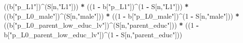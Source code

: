 \documentclass[
]{book}
\newenvironment{Shaded}{\begin{snugshade}}{\end{snugshade}}
\newcommand{\DecValTok}[1]{\textcolor[rgb]{0.00,0.00,0.81}{#1}}
\newcommand{\NormalTok}[1]{#1}
\newcommand{\SpecialCharTok}[1]{\textcolor[rgb]{0.81,0.36,0.00}{\textbf{#1}}}
\newcommand{\StringTok}[1]{\textcolor[rgb]{0.31,0.60,0.02}{#1}}
\begin{document}
\begin{Shaded}
\begin{Highlighting}[]
\NormalTok{      ((b[}\StringTok{"p\_L1"}\NormalTok{])}\SpecialCharTok{\^{}}\NormalTok{(S[n,}\StringTok{"L1"}\NormalTok{])) }\SpecialCharTok{*}
\NormalTok{      ((}\DecValTok{1} \SpecialCharTok{{-}}\NormalTok{ b[}\StringTok{"p\_L1"}\NormalTok{])}\SpecialCharTok{\^{}}\NormalTok{(}\DecValTok{1} \SpecialCharTok{{-}}\NormalTok{ S[n,}\StringTok{"L1"}\NormalTok{])) }\SpecialCharTok{*}
\NormalTok{      ((b[}\StringTok{"p\_L0\_male"}\NormalTok{])}\SpecialCharTok{\^{}}\NormalTok{(S[n,}\StringTok{"male"}\NormalTok{])) }\SpecialCharTok{*} 
\NormalTok{      ((}\DecValTok{1} \SpecialCharTok{{-}}\NormalTok{ b[}\StringTok{"p\_L0\_male"}\NormalTok{])}\SpecialCharTok{\^{}}\NormalTok{(}\DecValTok{1} \SpecialCharTok{{-}}\NormalTok{ S[n,}\StringTok{"male"}\NormalTok{])) }\SpecialCharTok{*} 
\NormalTok{      ((b[}\StringTok{"p\_L0\_parent\_low\_educ\_lv"}\NormalTok{])}\SpecialCharTok{\^{}}\NormalTok{(S[n,}\StringTok{"parent\_educ"}\NormalTok{])) }\SpecialCharTok{*}
\NormalTok{      ((}\DecValTok{1} \SpecialCharTok{{-}}\NormalTok{ b[}\StringTok{"p\_L0\_parent\_low\_educ\_lv"}\NormalTok{])}\SpecialCharTok{\^{}}\NormalTok{(}\DecValTok{1} \SpecialCharTok{{-}}\NormalTok{ S[n,}\StringTok{"parent\_educ"}\NormalTok{]))}
    

\end{Highlighting}
\end{Shaded}
\end{document}
